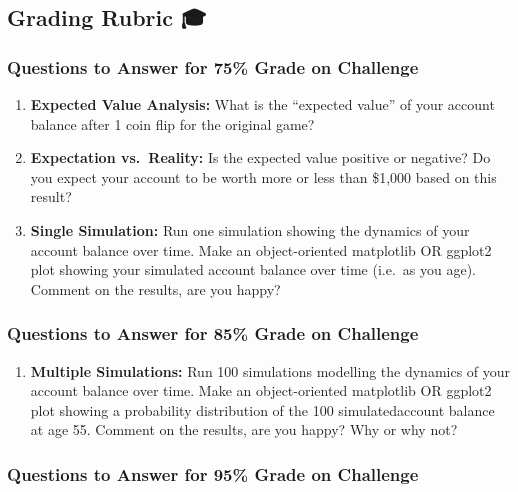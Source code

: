\documentclass[
  letterpaper,
  DIV=11,
  numbers=noendperiod]{scrartcl}
\providecommand{\tightlist}{%
  \setlength{\itemsep}{0pt}\setlength{\parskip}{0pt}}
\theoremstyle{definition}
\theoremstyle{remark}
\begin{document}
\subsection{Grading Rubric 🎓}\label{grading-rubric}

\subsubsection{Questions to Answer for 75\% Grade on
Challenge}\label{questions-to-answer-for-75-grade-on-challenge}

\begin{enumerate}
\def\labelenumi{\arabic{enumi}.}
\item
  \textbf{Expected Value Analysis:} What is the ``expected value'' of
  your account balance after 1 coin flip for the original game?
\item
  \textbf{Expectation vs.~Reality:} Is the expected value positive or
  negative? Do you expect your account to be worth more or less than
  \$1,000 based on this result?
\item
  \textbf{Single Simulation:} Run one simulation showing the dynamics of
  your account balance over time. Make an object-oriented matplotlib OR
  ggplot2 plot showing your simulated account balance over time (i.e.~as
  you age). Comment on the results, are you happy?
\end{enumerate}

\subsubsection{Questions to Answer for 85\% Grade on
Challenge}\label{questions-to-answer-for-85-grade-on-challenge}

\begin{enumerate}
\def\labelenumi{\arabic{enumi}.}
\setcounter{enumi}{3}
\tightlist
\item
  \textbf{Multiple Simulations:} Run 100 simulations modelling the
  dynamics of your account balance over time. Make an object-oriented
  matplotlib OR ggplot2 plot showing a probability distribution of the
  100 simulatedaccount balance at age 55. Comment on the results, are
  you happy? Why or why not?
\end{enumerate}

\subsubsection{Questions to Answer for 95\% Grade on
Challenge}\label{questions-to-answer-for-95-grade-on-challenge}
\end{document}
